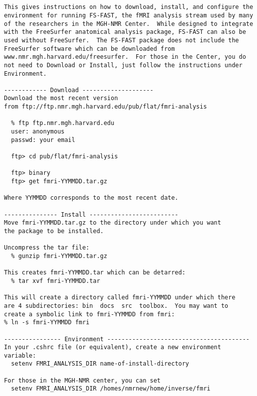 \documentclass[10pt]{article}
\begin{document}
\begin{center}
\begin{LARGE}
 \\
\end{LARGE}
\end{center}

\noindent 
\begin{verbatim}

This gives instructions on how to download, install, and configure the
environment for running FS-FAST, the fMRI analysis stream used by many
of the researchers in the MGH-NMR Center.  While designed to integrate
with the FreeSurfer anatomical analysis package, FS-FAST can also be
used without FreeSurfer.  The FS-FAST package does not include the
FreeSurfer software which can be downloaded from
www.nmr.mgh.harvard.edu/freesurfer.  For those in the Center, you do
not need to Download or Install, just follow the instructions under
Environment.

------------ Download --------------------
Download the most recent version
from ftp://ftp.nmr.mgh.harvard.edu/pub/flat/fmri-analysis

  % ftp ftp.nmr.mgh.harvard.edu
  user: anonymous
  passwd: your email

  ftp> cd pub/flat/fmri-analysis

  ftp> binary
  ftp> get fmri-YYMMDD.tar.gz

Where YYMMDD corresponds to the most recent date.

--------------- Install -------------------------
Move fmri-YYMMDD.tar.gz to the directory under which you want
the package to be installed.

Uncompress the tar file:
  % gunzip fmri-YYMMDD.tar.gz

This creates fmri-YYMMDD.tar which can be detarred:
  % tar xvf fmri-YYMMDD.tar

This will create a directory called fmri-YYMMDD under which there
are 4 subdirectories: bin  docs  src  toolbox.  You may want to
create a symbolic link to fmri-YYMMDD from fmri:
% ln -s fmri-YYMMDD fmri

---------------- Environment ----------------------------------------
In your .cshrc file (or equivalent), create a new environment variable:
  setenv FMRI_ANALYSIS_DIR name-of-install-directory

For those in the MGH-NMR center, you can set
  setenv FMRI_ANALYSIS_DIR /homes/nmrnew/home/inverse/fmri


\end{verbatim}
\end{document}
